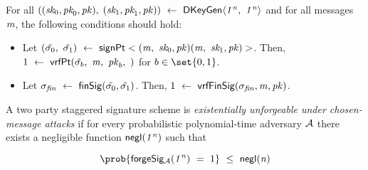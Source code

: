 \begin{definition}
\label{def:two-party-sig-correctness}
	For all $((\textit{sk}_0, \textit{pk}_0, \mathit{pk}),$ $(\textit{sk}_1, \textit{pk}_1, \mathit{pk})) ~\leftarrow~ \mathsf{DKeyGen}\langle \mathit{1^n} ,~ \mathit{1^n} \rangle$ and for all messages $\mathit{m}$, the following conditions should hold:
	\begin{itemize}
		\item Let $(\tilde{\sigma_0} ,~ \tilde{\sigma_1}) ~\leftarrow~ \mathsf{signPt}<(\mathit{m} ,~ \textit{sk}_0, \mathit{pk})(\mathit{m} ,~ \textit{sk}_1, \mathit{pk})>$. Then, $1 ~\leftarrow~ \mathsf{vrfPt}(\tilde{\sigma_b} ,~ \mathit{m} ,~ \mathit{pk}_b ,~ )$ for $b \in \set{0,1}$. 
		\item  Let $\sigma_{\mathit{fin}} ~\leftarrow~ \mathsf{finSig}(\tilde{\sigma_0},\tilde{\sigma_1})$. Then, $1 ~\leftarrow~ \mathsf{vrfFinSig}(\sigma_{\mathit{fin}}, \mathit{m}, \mathit{pk})$. 
	\end{itemize}
\end{definition}


\begin{definition}
\label{def:two-party-sig-security}
	A two party staggered signature scheme is \emph{existentially unforgeable under chosen-message attacks} if for every probabilistic polynomial-time adversary $\mathcal{A}$ there exists a negligible function $\mathsf{negl}(\mathit{1^n})$ such that 

\[ \prob{\procExpForgeSimple{\varSecParam} \opEqNoQ 1} \opSmEq \funNegl{\varN} \]

\begin{center}
    \fbox{
    \begin{varwidth}{\textwidth}
        \procedure[linenumbering]{$\procExpForgeSimple{\varSecParam}$} {
         \varSet \opAssign \cnstEmptySet \\
        ((\varSecKeyAlice, \varPubKeyAlice), (\varSecKeyBob, \varPubKeyBob)) \opFunResult \procKeyGenPt{\varSecParam}{\varSecParam}\\
        (\varMsg^* \opSeperate (\varSigAlice^*, \varSigBob^*)) \opFunResult \cnstAdversary^{\procSignOracleOne{\cdot}}(\varPubKeyAlice, \varPubKeyBob, \varSecKeyBob) \\
        \varSignature^* \opFunResult \procFinSig{\varSigAlice^*}{\varSigBob^*} \\
        \pcreturn ((\varMsg) \opNotIn \varSet  \opAnd \procVerFinSig(\varSignature^*, \varMsg^*, \varPubKey))
        }\\[2\baselineskip]
        \procedure[linenumbering]{$\procSignOracleOne{\varMsg}$} {
        (\varSigAlice \opSeperate \varSigBob) \opFunResult \procSignPt{\varMsg}{\varSecKeyAlice, \varPubKey}{\varSecKeyBob, \varPubKey}\\
        \varSet \opAssign \varSet \opUnion \{\varMsg\} \\
        \pcreturn (\varSigAlice \opSeperate \varSigBob)
        }
    \end{varwidth}
    }
\end{center}

\end{definition}



